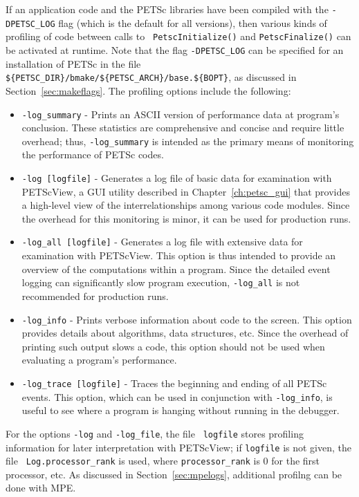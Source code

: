 {If an application code and the PETSc libraries have been compiled with
the {\tt -DPETSC\_LOG} flag (which is the default for all versions),
then various kinds of profiling of code between calls to {\tt
PetscInitialize()} and {\tt PetscFinalize()} can be 
activated at runtime.  Note that the flag {\tt -DPETSC\_LOG} can be
specified for an installation of PETSc in the file {\tt
\$\{PETSC\_DIR\}/bmake/\$\{PETSC\_ARCH\}/base.\$\{BOPT\}}, as discussed in
Section~\ref{sec:makeflags}.  The profiling options include the following:
   
\begin{itemize}
\item {\tt -log\_summary} - Prints an ASCII version of performance data
     at program's conclusion. These statistics are comprehensive and concise
     and require little overhead; thus, {\tt -log\_summary} is intended as
     the primary means of monitoring the performance of PETSc codes.
\item {\tt -log [logfile]} - Generates a log file of basic data for examination
     with PETScView, a GUI utility described in Chapter~\ref{ch:petsc_gui}
     that provides a high-level view of the interrelationships
     among various code modules.  Since the overhead for this monitoring is minor,
     it can be used for production runs.  
\item {\tt -log\_all [logfile]} - Generates a log file with extensive data
     for examination with PETScView.  This option is thus intended to
     provide an overview of the computations within a program.  Since the
     detailed event logging can significantly slow program execution, 
     {\tt -log\_all} is not recommended for production runs.
\item {\tt -log\_info} - Prints verbose information about code to the screen. 
     This option provides details about algorithms, data structures, etc.
     Since the overhead of printing such output slows a code, this
     option should not be used when evaluating a program's performance.
\item {\tt -log\_trace [logfile]} - Traces the beginning and ending of all
     PETSc events.  This option, which can be used in conjunction with 
     {\tt -log\_info}, is useful to see where a program is hanging
     without running in the debugger.  
\end{itemize}
For the options {\tt -log} and {\tt -log\_file}, the file {\tt
logfile} stores profiling information for later interpretation with
PETScView; if {\tt logfile} is not given, the file {\tt
Log.processor\_rank} is used, where {\tt processor\_rank} is 0 for the
first processor, etc.  As discussed in Section~\ref{sec:mpelogs},
additional profilng can be done with MPE.

}
